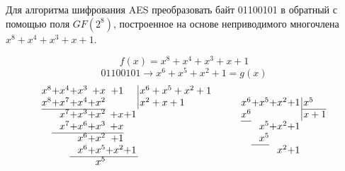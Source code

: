 \begin{problem}
    Для алгоритма шифрования AES преобразовать байт 01100101 в обратный с помощью поля \(GF(2^8)\),
    построенное на основе неприводимого многочлена \(x^8 + x^4 + x^3 + x + 1\).
\end{problem}
\begin{solution}
    \[
    f(x) = x^8 + x^4 + x^3 + x + 1
    \]
    \[
    01100101 \longrightarrow x^6 + x^5 + x^2 + 1 = g(x)
    \]
    \[
    \begin{array}{lll}
        \arraycolsep=0.01em
    \begin{array}{rrrrrr@{\,}r|l}
            x^8 & +x^4 & +x^3 & +x & +1 &&&\, x^6 + x^5 + x^2 + 1 \\
            \cline{7-7}
            x^8 & +x^7 & +x^4 & +x^2  &&&&\, x^2 + x + 1 \\
            \cline{1-4}
            & x^7 & + x^3 & + x^2 & + x & + 1 \\
            & x^7 & + x^6 & + x^3 & + x \\
            \cline{2-5}
            & & x^6 & + x^2 & + 1 \\
            & & x^6 & + x^5 & + x^2 & + 1\\
            \cline{3 - 6}
            &&&x^5
    \end{array}
    & \quad &
    \arraycolsep=0.01em
    \begin{array}{rrrr@{\,}r|l}
            x^6 & +x^5 & +x^2 & +1 &&\, x^5 \\
            \cline{6-6}
            x^6 & &  & &&\, x + 1 \\
            \cline{1-1}
            & x^5 & + x^2 & + 1 \\
            & x^5 \\
            \cline{2-2}
            & & x^2 &+ 1
    \end{array} \\\\


\end{array}\]
\end{solution}
